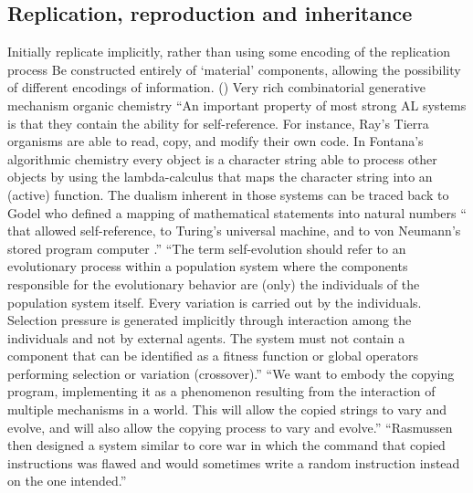 \subsection{Replication, reproduction and inheritance}\label{replication-reproduction-and-inheritance}

\begin{NOTES}
Initially replicate implicitly, rather than using some encoding of the replication process  \parencite{Taylor2001}
Be constructed entirely of `material' components, allowing the possibility of different encodings of information. ()
Very rich combinatorial generative mechanism \eg organic chemistry \parencite{Vasas2015}
``An important property of most strong AL systems is that they contain the ability for self-reference. For instance, Ray's Tierra organisms are able to read, copy, and modify their own code. In Fontana's algorithmic chemistry every object is a character string able to process other objects by using the lambda-calculus that maps the character string into an (active) function. The dualism inherent in those systems can be traced back to Godel who defined a mapping of mathematical statements into natural numbers `` that allowed self-reference, to Turing's universal machine, and to von Neumann's stored program computer .''\parencite{Dittrich1998}
``The term self-evolution should refer to an evolutionary process within a population system where the components responsible for the evolutionary behavior are (only) the individuals of the population
system itself. Every variation is carried out by the individuals. Selection pressure is generated implicitly through interaction among the individuals and not by external agents. The system must not contain a component that can be identified as a fitness function or global operators performing selection or variation (\eg crossover).'' \cite{Dittrich1998}
``We want to embody the copying program, implementing it as a phenomenon resulting from the interaction of multiple mechanisms in a world. This will allow the copied strings to vary and evolve, and will also allow the copying process to vary and evolve.'' \cite{Nellis2014}
``Rasmussen then designed a system similar to core war in which the command that copied instructions was flawed and would sometimes write a random instruction instead on the one intended.'' \parencite{Ofria2004}
\end{NOTES}
